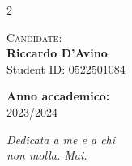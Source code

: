 \documentclass[12pt,a4paper, oneside, openright]{book}
\begin{document}
\begin{titlepage}
\begin{minipage}[t]{1\textwidth}
\begin{multicols}{2}
         \columnbreak
         \columnbreak

         \begin{flushright}
            {\normalsize{\textsc{Candidate:}}{\normalsize\vspace{1mm}
            \\ \normalsize{\textbf{Riccardo D'Avino}}\\
            \vspace{2mm}
            \normalsize{Student ID: 0522501084}}} \\
         \end{flushright}
    \end{multicols}
\end{minipage}

\begin{center}
    \vspace{3mm}
    {\normalsize{\textbf{Anno accademico:}}{\normalsize\vspace{1mm}
    \\ \normalsize{2023/2024}}}  
\end{center}

\end{titlepage}

\doublespacing


\cleardoublepage
\thispagestyle{empty}
\begin{flushright}
\itshape Dedicata a me e a chi \\ non molla. Mai. \vspace{5mm}
\end{flushright}
\cleardoublepage

\end{document}
